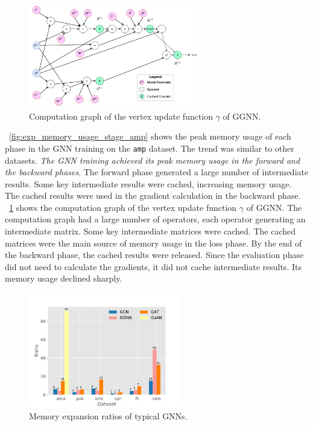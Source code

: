 \begin{figure}
    \centering
    \includegraphics[height=4.5cm]{figs/illustration/ggnn_vertex_func_computation_graph.pdf}
    \caption{Computation graph of the vertex update function $\gamma$ of GGNN.}
    \label{fig:ggnn_vertex_func_computation_graph}
\end{figure}

\figurename~\ref{fig:exp_memory_usage_stage_amp} shows the peak memory usage of each phase in the GNN training on the \texttt{amp} dataset.
The trend was similar to other datasets.
\emph{The GNN training achieved its peak memory usage in the forward and the backward phases}.
The forward phase generated a large number of intermediate results.
Some key intermediate results were cached, increasing memory usage.
The cached results were used in the gradient calculation in the backward phase.
\figurename~\ref{fig:ggnn_vertex_func_computation_graph} shows the computation graph of the vertex update function $\gamma$ of GGNN.
The computation graph had a large number of operators, each operator generating an intermediate matrix.
Some key intermediate matrices were cached.
The cached matrices were the main source of memory usage in the loss phase.
By the end of the backward phase, the cached results were released.
Since the evaluation phase did not need to calculate the gradients, it did not cache intermediate results.
Its memory usage declined sharply.

\begin{figure}
    \centering
    \includegraphics[height=5cm]{figs/experiments/exp_memory_expansion_ratio.pdf}
    \caption{Memory expansion ratios of typical GNNs.}
    \label{fig:exp_memory_expansion_ratio}
\end{figure}

